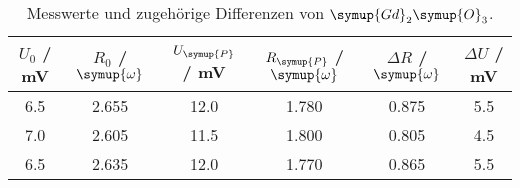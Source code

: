 \begin{table}[!htp]
\centering
\caption{Messwerte und zugehörige Differenzen von  $\symup{Gd}_2\symup{O}_3$.}
\label{tab:Gd2O3}
\begin{tabular}{c c c c c c}
\toprule
{$U_0$ / mV} & {$R_0$ / $\symup{\omega}$} & {$U_{\symup{P}}$ / mV} & {$R_{\symup{P}}$ / $\symup{\omega}$} & {$\Delta R$ / $\symup{\omega}$} & {$\Delta U$ / mV} \\
\midrule
6.5 & 2.655 & 12.0 & 1.780 & 0.875 & 5.5 \\
7.0 & 2.605 & 11.5 & 1.800 & 0.805 & 4.5 \\
6.5 & 2.635 & 12.0 & 1.770 & 0.865 & 5.5 \\
\bottomrule
\end{tabular}
\end{table}